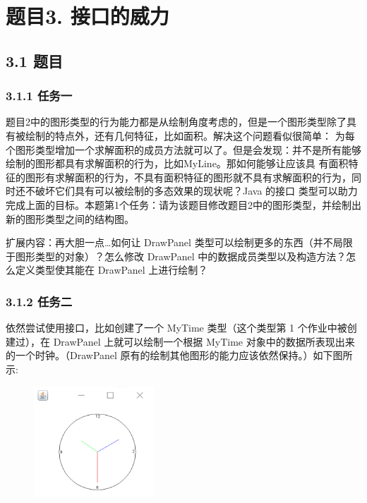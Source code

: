 \vspace{-3cm}\chapter{题目3. 接口的威力}

\section{3.1 题目}

\subsection{3.1.1 任务一}
题目2中的图形类型的行为能力都是从绘制角度考虑的，但是一个图形类型除了具有被绘制的特点外，还有几何特征，比如面积。解决这个问题看似很简单：
为每个图形类型增加一个求解面积的成员方法就可以了。但是会发现：并不是所有能够绘制的图形都具有求解面积的行为，比如MyLine。那如何能够让应该具
有面积特征的图形有求解面积的行为，不具有面积特征的图形就不具有求解面积的行为，同时还不破坏它们具有可以被绘制的多态效果的现状呢？Java 的接口
类型可以助力完成上面的目标。本题第1个任务：请为该题目修改题目2中的图形类型，并绘制出新的图形类型之间的结构图。

扩展内容：再大胆一点…如何让 DrawPanel 类型可以绘制更多的东西（并不局限于图形类型的对象）？怎么修改
DrawPanel 中的数据成员类型以及构造方法？怎么定义类型使其能在 DrawPanel 上进行绘制？

\subsection{3.1.2 任务二}

依然尝试使用接口，比如创建了一个 MyTime 类型（这个类型第 1 个作业中被创建过），在 DrawPanel 上就可以绘制一个根据 MyTime 
对象中的数据所表现出来的一个时钟。（DrawPanel 原有的绘制其他图形的能力应该依然保持。）如下图所示:

\begin{figure}[H]
    \centering
    \includegraphics[width = 0.4\textwidth]{../pic/3/3.1.png}
\end{figure}

